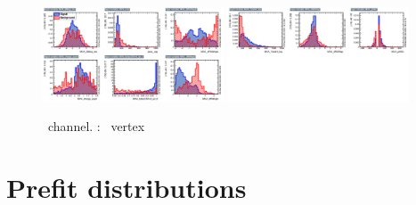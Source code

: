 \begin{figure}[htbp]
	\includegraphics[width=0.48\textwidth]{6_Search/Figures/MVAtechnics/singletopzut/uuu/variables_id_c1.png}
	\includegraphics[width=0.48\textwidth]{6_Search/Figures/MVAtechnics/singletopzut/uuu/variables_id_c2.png}
	\caption{\mumumu\ channel. \STSR: \Zut\ vertex }
	\label{image:Figuresuuusingletopzut}
\end{figure}
\chapter{Prefit distributions}
\label{app:Prefit}
